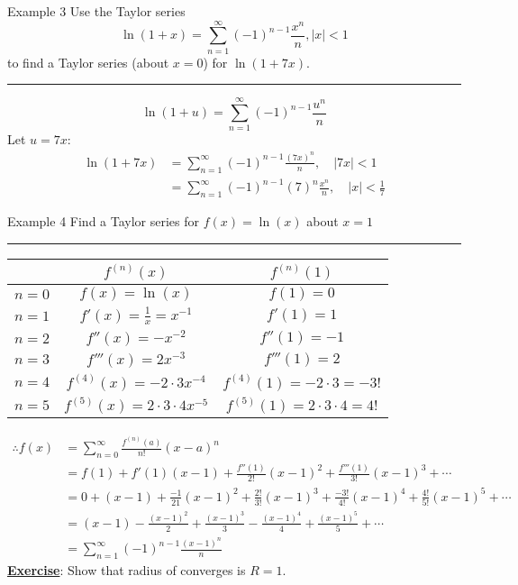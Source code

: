 \documentclass[12pt,a4paper]{article}
\begin{document}
\begin{eg}{Example 3}
	Use the Taylor series $$\ln{(1+x)}=\sum^\infty_{n=1}(-1)^{n-1}\frac{x^n}{n}, |x|<1$$ to find a Taylor series (about $x=0$) for $\ln{(1+7x)}$.\\
	\noindent\rule[0.25\baselineskip]{\textwidth}{1pt}
	$$\ln{(1+u)}=\sum^\infty_{n=1}(-1)^{n-1}\frac{u^n}{n}$$
	Let $u=7x$: 
	$$\begin{aligned}
		\ln{(1+7x)}&=\sum^\infty_{n=1}(-1)^{n-1}\frac{(7x)^n}{n}	,\quad |7x|<1\\
		&=\sum^\infty_{n=1}(-1)^{n-1}(7)^n\frac{x^n}{n},\quad |x|<\frac{1}{7}
	\end{aligned}$$
\end{eg}
\begin{eg}{Example 4}
	Find a Taylor series for $f(x)=\ln{(x)}$ about $x=1$\\
	\noindent\rule[0.25\baselineskip]{\textwidth}{1pt}
	\begin{center}
		\begin{tabular}{c|c|c}
			&$f^{(n)}(x)$ & $f^{(n)}(1)$\\
			\hline
			$n=0$&$f(x)=\ln{(x)}$&$f(1)=0$\\
			$n=1$&$f'(x)=\frac{1}{x}=x^{-1}$&$f'(1)=1$\\
			$n=2$&$f''(x)=-x^{-2}$&$f''(1)=-1$\\
			$n=3$&$f'''(x)=2x^{-3}$&$f'''(1)=2$\\
			$n=4$&$f^{(4)}(x)=-2\cdot3x^{-4}$&$f^{(4)}(1)=-2\cdot3=-3!$\\
			$n=5$&$f^{(5)}(x)=2\cdot3\cdot4x^{-5}$&$f^{(5)}(1)=2\cdot3\cdot4=4!$
		\end{tabular}
	\end{center}
	$$\begin{aligned}
		\therefore f(x)&=\sum^\infty_{n=0}\frac{f^{(n)}(a)}{n!}(x-a)^n\\
		&=f(1)+f'(1)(x-1)+\frac{f''(1)}{2!}(x-1)^2+\frac{f'''(1)}{3!}(x-1)^3+\cdots\\
		&=0+(x-1)+\frac{-1}{21}(x-1)^2+\frac{2!}{3!}(x-1)^3+\frac{-3!}{4!}(x-1)^4+\frac{4!}{5!}(x-1)^5+\cdots\\
		&=(x-1)-\frac{(x-1)^2}{2}+\frac{(x-1)^3}{3}-\frac{(x-1)^4}{4}+\frac{(x-1)^5}{5}+\cdots\\
		&=\sum^\infty_{n=1}(-1)^{n-1}\frac{(x-1)^n}{n}
	\end{aligned}$$
	\underline{\textbf{Exercise}}: Show that radius of converges is $R=1$.
\end{eg}
\end{document}

